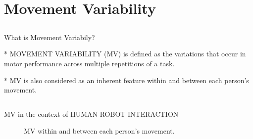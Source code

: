 
\section{Movement Variability}


\subsection{}
{


\begin{frame}{What is Movement Variabily?}


\LARGE
* MOVEMENT VARIABILITY (MV) is defined as the variations that occur in motor
performance across multiple repetitions of a task.

\LARGE
* MV is also considered as an inherent feature within and between 
each person's movement.

\end{frame}
}


\subsection{}
{

\begin{frame}{MV in the context of HUMAN-ROBOT INTERACTION}
    \begin{figure}
	\caption{MV within and between each person's movement.} 
   \end{figure}
	
\end{frame}
}


